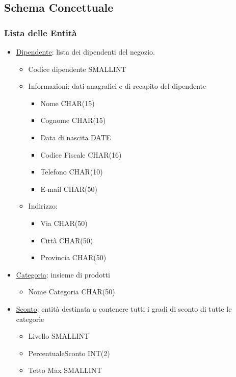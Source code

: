 \subsection{Schema Concettuale}

\subsubsection{Lista delle Entit\`a}

\begin{itemize}

\item \underline{Dipendente}: lista dei dipendenti del negozio.
  
  \begin{itemize}

  \item Codice dipendente SMALLINT
    
  \item Informazioni: dati anagrafici e di recapito del dipendente
    \begin{itemize}
    \item Nome CHAR(15)
    \item Cognome CHAR(15)
    \item Data di nascita DATE
    \item Codice Fiscale CHAR(16)
    \item Telefono CHAR(10)
    \item E-mail CHAR(50)
    \end{itemize}
    
  \item Indirizzo:
    \begin{itemize}
    \item Via CHAR(50)
    \item Citt\`a CHAR(50)
    \item Provincia CHAR(50)
    \end{itemize}

  \end{itemize}

\item \underline{Categoria}: insieme di prodotti
  \begin{itemize}
  \item Nome Categoria CHAR(50)
  \end{itemize}

\item \underline{Sconto}: entit\`a destinata a contenere tutti i gradi di sconto di tutte le categorie
  \begin{itemize}
  \item Livello SMALLINT
  \item PercentualeSconto INT(2)
  \item Tetto Max SMALLINT
  \end{itemize}


\end{itemize}
